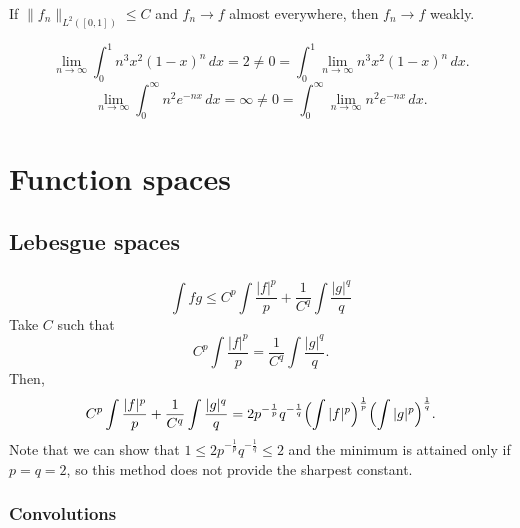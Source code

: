 \documentclass{../../large}
\begin{document}
\begin{prb}
\end{prb}



If $\|f_n\|_{L^2([0,1])}\le C$ and $f_n\to f$ almost everywhere, then $f_n\to f$ weakly.

\[\lim_{n\to\infty}\int_0^1n^3x^2(1-x)^n\,dx=2\ne0=\int_0^1\lim_{n\to\infty}n^3x^2(1-x)^n\,dx.\]
\[\lim_{n\to\infty}\int_0^\infty n^2e^{-nx}\,dx=\infty\ne0=\int_0^\infty\lim_{n\to\infty}n^2e^{-nx}\,dx.\]










\part{Function spaces}


\chapter{Lebesgue spaces}
\section{}

\begin{prb}
\end{prb}
\begin{pf}
\[\int fg\le C^p\int\frac{|f|^p}p+\frac1{C^q}\int\frac{|g|^q}q\]
Take $C$ such that
\[C^p\int\frac{|f|^p}p=\frac1{C^q}\int\frac{|g|^q}q.\]
Then,
\[C^p\int\frac{|f|^p}p+\frac1{C^q}\int\frac{|g|^q}q=2p^{-\frac1p}q^{-\frac1q}\Bigl(\int|f|^p\Bigr)^{\frac1p}\Bigl(\int|g|^p\Bigr)^{\frac1q}.\]
Note that we can show that $1\le2p^{-\frac1p}q^{-\frac1q}\le2$ and the minimum is attained only if $p=q=2$, so this method does not provide the sharpest constant.
\end{pf}



\section{Convolutions}

\begin{prb}[Convolution?]
\end{prb}
\begin{prb}
\end{prb}
\begin{prb}
\end{prb}
\end{document}
